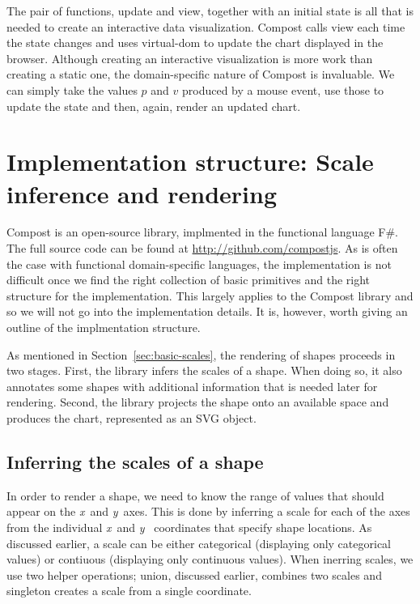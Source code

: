 \documentclass{jfp}
\newcommand{\X}{\emph{x}\ }
\newcommand{\Y}{\emph{y}\ }
\newcommand{\ident}[1]{\textnormal{\textcolor{idclr}{\sffamily #1}}}
\newcommand{\urrl}[1]{\textnormal{\textcolor{urlclr}{\url{#1}}}}
\begin{document}
The pair of functions, \ident{update} and \ident{view}, together with an initial state is
all that is needed to create an interactive data visualization. Compost calls
\ident{view} each time the state changes and uses virtual-dom to update the chart
displayed in the browser. Although creating an interactive visualization is more work than
creating a static one, the domain-specific nature of Compost is invaluable. We can
simply take the values $p$ and $v$ produced by a mouse event, use those to update the state
and then, again, render an updated chart.


\section{Implementation structure: Scale inference and rendering}
\label{sec:impl}

Compost is an open-source library, implmented in the functional language F\#. The full source
code can be found at \urrl{http://github.com/compostjs}.
As is often the case with functional domain-specific languages, the implementation is not difficult
once we find the right collection of basic primitives and the right structure for the implementation.
This largely applies to the Compost library and so we will not go into the implementation details.
It is, however, worth giving an outline of the implmentation structure.

As mentioned in Section~\ref{sec:basic-scales}, the rendering of shapes proceeds in two stages.
First, the library infers the scales of a shape. When doing so, it also annotates some shapes
with additional information that is needed later for rendering. Second, the library projects
the shape onto an available space and produces the chart, represented as an SVG object.

\subsection{Inferring the scales of a shape}

In order to render a shape, we need to know the range of values that should appear on the \X and
\Y axes. This is done by inferring a scale for each of the axes from the individual \X and \Y
coordinates that specify shape locations. As discussed earlier, a scale can be either categorical
(displaying only categorical values) or contiuous (displaying only continuous values). When
inerring scales, we use two helper operations; \ident{union}, discussed earlier, combines two
scales and \ident{singleton} creates a scale from a single coordinate.
\end{document}
